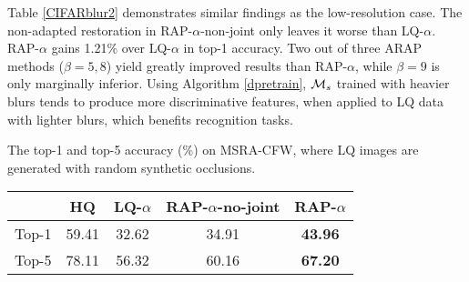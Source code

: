 \documentclass[10pt,twocolumn,twoside]{IEEEtran} %
\begin{document}
Table \ref{CIFARblur2} demonstrates similar findings as the low-resolution case. The non-adapted restoration in RAP-$\alpha$-non-joint only leaves it worse than LQ-$\alpha$. RAP-$\alpha$ gains 1.21\% over LQ-$\alpha$ in top-1 accuracy. Two out of three ARAP methods ($\beta = 5, 8$) yield greatly improved results than RAP-$\alpha$, while $\beta = 9$ is only marginally inferior. Using Algorithm \ref{dpretrain}, ${\mathcal{M}}_s$ trained with heavier blurs 
tends to produce more discriminative features, when applied to LQ data with lighter blurs, which benefits recognition tasks.
	\fontsize{10pt}{12pt}\selectfont
	\caption{The top-1 and top-5 accuracy (\%) on MSRA-CFW, where LQ images are generated with random synthetic occlusions.}
	\begin{center}
		\begin{tabular}{c|c|c|c|c}
			\hline
			& HQ & LQ-$\alpha$ & RAP-$\alpha$-no-joint & RAP-$\alpha$ \\ \hline
			\hline
			Top-1  & 59.41 & 32.62 & 34.91 & \textbf{43.96} \\ 
			Top-5  & 78.11 & 56.32 & 60.16 & \textbf{67.20} \\ \hline
		\end{tabular}
	\end{center}
	
\end{document}
